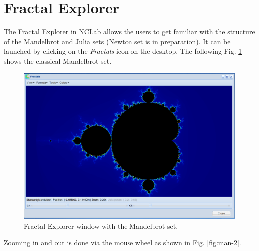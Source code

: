 \documentclass[article,A4,12pt]{llncs}
\begin{document}

\section*{Fractal Explorer}

The Fractal Explorer in NCLab allows the users to get familiar with the structure of the Mandelbrot
and Julia sets (Newton set is in preparation). It can be launched by clicking on the 
{\em Fractals} icon on the desktop. The following Fig. \ref{fig:man-1} shows the classical 
Mandelbrot set.\\

\begin{figure}[!ht]
\begin{center}
\includegraphics[width=\textwidth]{img/mandelbrot-1.png}
\end{center}
\caption{Fractal Explorer window with the Mandelbrot set.}
\label{fig:man-1}
\end{figure}

Zooming in and out is done via the mouse wheel as shown in Fig. \ref{fig:man-2}.

\clearpage
\end{document}
